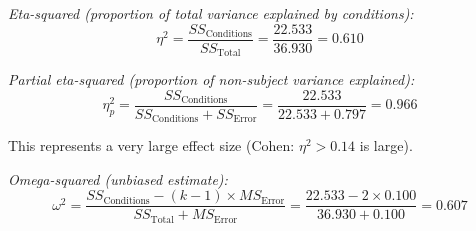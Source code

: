 \documentclass[12pt]{article}
\begin{document}
\begin{solution}
\textit{Eta-squared (proportion of total variance explained by conditions):}
\[
\eta^2 = \frac{SS_{\text{Conditions}}}{SS_{\text{Total}}} = \frac{22.533}{36.930} = 0.610
\]

\textit{Partial eta-squared (proportion of non-subject variance explained):}
\[
\eta_p^2 = \frac{SS_{\text{Conditions}}}{SS_{\text{Conditions}} + SS_{\text{Error}}} = \frac{22.533}{22.533 + 0.797} = 0.966
\]

This represents a very large effect size (Cohen: $\eta^2 > 0.14$ is large).

\textit{Omega-squared (unbiased estimate):}
\[
\omega^2 = \frac{SS_{\text{Conditions}} - (k-1) \times MS_{\text{Error}}}{SS_{\text{Total}} + MS_{\text{Error}}} = \frac{22.533 - 2 \times 0.100}{36.930 + 0.100} = 0.607
\]

\end{solution}
\end{document}
